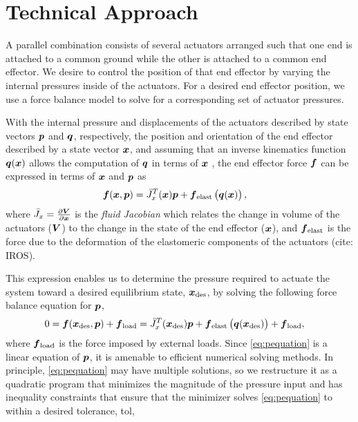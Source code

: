 \section{Technical Approach}    \label{sec:technical-approach}

A parallel combination consists of several actuators arranged such that one end is attached to a common ground while the other is attached to a common end effector. We desire to control the position of that end effector by varying the internal pressures inside of the actuators. For a desired end effector position, we use a force balance model to solve for a corresponding set of actuator pressures.

With the internal pressure and displacements of the actuators described by state vectors $\p$ and $\q$, respectively, the position and orientation of the end effector described by a state vector $\x$, and assuming that an inverse kinematics function $\q(\x)$ allows the computation of  $\q$ in terms of $\x$ , the end effector force $\f$ can be expressed in terms of $\x$ and $\p$ as 
\begin{align}
    \f (\x, \p) &= \J_x^T (\x) \p + \f_{\tx{elast}} \left( \q(\x) \right),
\end{align}
where $\J_x = \frac{\partial \vec{V}}{\partial \x}$ is the \emph{fluid Jacobian} which relates the change in volume of the actuators ($\V$) to the change in the state of the end effector ($\x$), and $\f_\tx{elast}$ is the force due to the deformation of the elastomeric components of the actuators (cite: IROS).

This expression enables us to determine the pressure required to actuate the system toward a desired equilibrium state, $\x_\tx{des}$, by solving the following force balance equation for $\p$,
\begin{align}
    0 &= \f (\x_{\tx{des}}, \p) + \f_\tx{load} =  \J_x^T (\x_\tx{des}) \p + \f_{\tx{elast}} \left( \q(\x_\tx{des}) \right) + \f_\tx{load} , 
    \label{eq:pequation}
\end{align}
where $\f_\tx{load}$ is the force imposed by external loads.
Since \eqref{eq:pequation} is a linear equation of $\p$, it is amenable to efficient numerical solving methods. In principle, \eqref{eq:pequation} may have multiple solutions, so we restructure it as a quadratic program that minimizes the magnitude of the pressure input and has inequality constraints that ensure that the minimizer solves \eqref{eq:pequation} to within a desired tolerance, tol,


